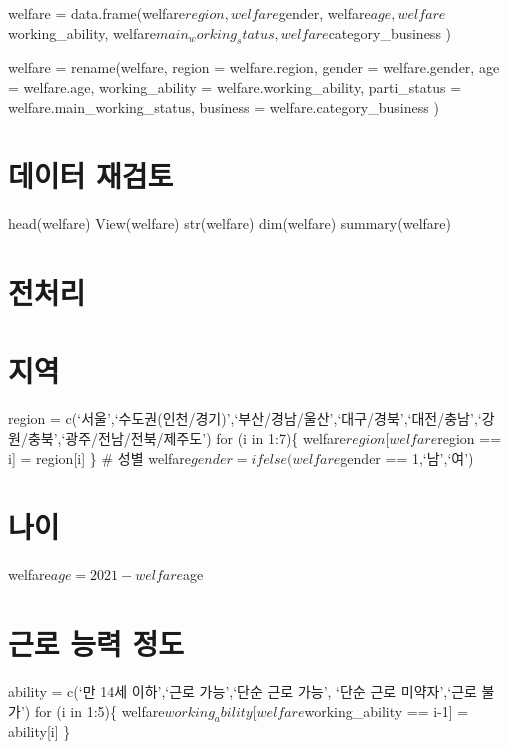 \documentclass[
]{article}
\begin{document}
welfare = data.frame(welfare\(region,  welfare\)gender,
welfare\(age,  welfare\)working\_ability,
welfare\(main_working_status,  welfare\)category\_business )

welfare = rename(welfare, region = welfare.region, gender =
welfare.gender, age = welfare.age, working\_ability =
welfare.working\_ability, parti\_status = welfare.main\_working\_status,
business = welfare.category\_business )

\hypertarget{uxb370uxc774uxd130-uxc7acuxac80uxd1a0}{%
\section{데이터 재검토}\label{uxb370uxc774uxd130-uxc7acuxac80uxd1a0}}

head(welfare) View(welfare) str(welfare) dim(welfare) summary(welfare)

\hypertarget{uxc804uxcc98uxb9ac}{%
\section{전처리}\label{uxc804uxcc98uxb9ac}}

\hypertarget{uxc9c0uxc5ed}{%
\section{지역}\label{uxc9c0uxc5ed}}

region =
c(`서울',`수도권(인천/경기)',`부산/경남/울산',`대구/경북',`대전/충남',`강원/충북',`광주/전남/전북/제주도')
for (i in 1:7)\{ welfare\(region[welfare\)region == i{]} = region{[}i{]}
\} \# 성별 welfare\(gender = ifelse(welfare\)gender == 1,`남',`여')

\hypertarget{uxb098uxc774}{%
\section{나이}\label{uxb098uxc774}}

welfare\(age = 2021-welfare\)age

\hypertarget{uxadfcuxb85c-uxb2a5uxb825-uxc815uxb3c4}{%
\section{근로 능력 정도}\label{uxadfcuxb85c-uxb2a5uxb825-uxc815uxb3c4}}

ability = c(`만 14세 이하',`근로 가능',`단순 근로 가능', `단순 근로
미약자',`근로 불가') for (i in 1:5)\{
welfare\(working_ability[welfare\)working\_ability == i-1{]} =
ability{[}i{]} \}
\end{document}
